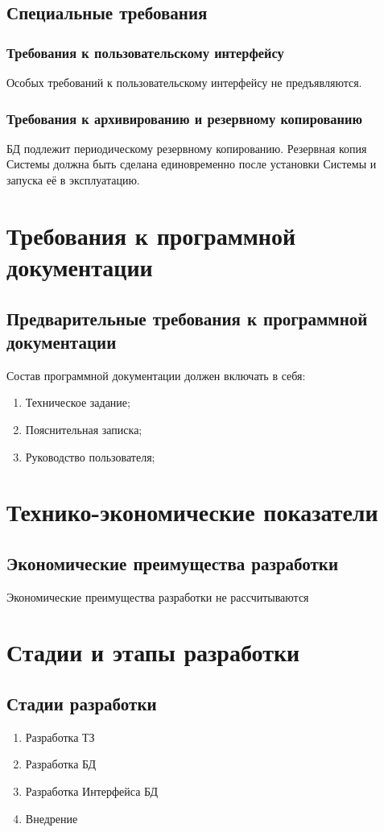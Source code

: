   \subsection{Специальные требования}
    \subsubsection{Требования к пользовательскому интерфейсу}
      Особых требований к пользовательскому интерфейсу не предъявляются.
    \subsubsection{Требования к архивированию и резервному копированию}
      БД подлежит периодическому резервному копированию. Резервная копия Системы должна быть сделана единовременно после установки Системы и запуска её в эксплуатацию.
\section{Требования к программной документации}
  \subsection{Предварительные требования к программной документации}
    Состав программной документации должен включать в себя:
    \begin{enumerate}
    \item Техническое задание;
    \item Пояснительная записка;
    \item Руководство пользователя;
    \end{enumerate}
\section{Технико-экономические показатели}
  \subsection{Экономические преимущества разработки}
    Экономические преимущества разработки не рассчитываются 
\section{Стадии и этапы разработки}
  \subsection{Стадии разработки}
   \begin{enumerate}
    \item Разработка ТЗ
    \item Разработка БД
    \item Разработка Интерфейса БД
    \item Внедрение
  \end{enumerate}
